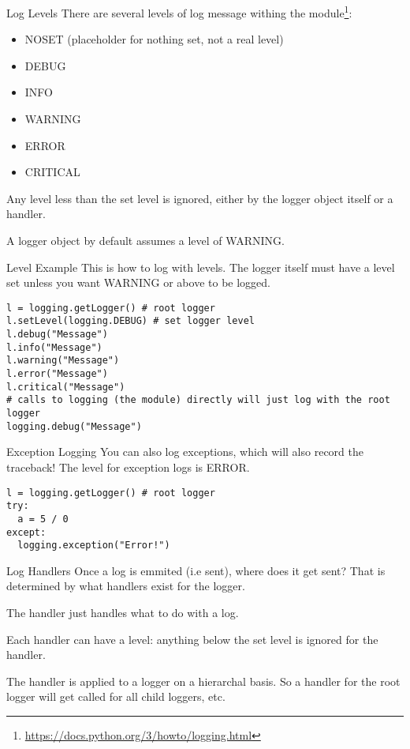 \begin{frame}{Log Levels}
  There are several levels of log message withing the module\footnote{\url{https://docs.python.org/3/howto/logging.html}}:
  \begin{itemize}
    \item NOSET (placeholder for nothing set, not a real level)
    \item DEBUG
    \item INFO
    \item WARNING
    \item ERROR
    \item CRITICAL
  \end{itemize}
  Any level less than the set level is ignored, either by the logger object itself or a handler.

  A logger object by default assumes a level of WARNING.
\end{frame}

\begin{frame}[containsverbatim]{Level Example}
  This is how to log with levels. The logger itself must have a level set unless you want WARNING or above to be logged.
  \begin{verbatim}
l = logging.getLogger() # root logger
l.setLevel(logging.DEBUG) # set logger level
l.debug("Message")
l.info("Message")
l.warning("Message")
l.error("Message")
l.critical("Message")
# calls to logging (the module) directly will just log with the root logger
logging.debug("Message")
\end{verbatim}
\end{frame}

\begin{frame}[containsverbatim]{Exception Logging}
  You can also log exceptions, which will also record the traceback! The level for exception logs is ERROR.
  \begin{verbatim}
l = logging.getLogger() # root logger
try:
  a = 5 / 0
except:
  logging.exception("Error!")
\end{verbatim}
\end{frame}

\begin{frame}{Log Handlers}
  Once a log is emmited (i.e sent), where does it get sent? That is determined by what handlers exist for the logger.

  The handler just handles what to do with a log.

  Each handler can have a level: anything below the set level is ignored for the handler.

  The handler is applied to a logger on a hierarchal basis. So a handler for the root logger will get called for all child loggers, etc.
\end{frame}

